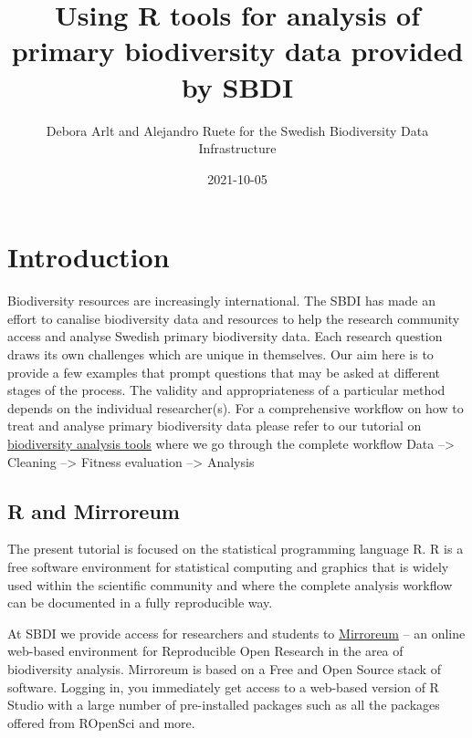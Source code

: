 \documentclass[
  10pt,
]{article}
\title{Using R tools for analysis of primary biodiversity data provided by SBDI}
\author{Debora Arlt and Alejandro Ruete for the Swedish Biodiversity Data Infrastructure}
\date{2021-10-05}
\begin{document}
\maketitle

{
\hypersetup{linkcolor=}
\setcounter{tocdepth}{2}
\tableofcontents
}
\hypertarget{introduction}{%
\section*{Introduction}\label{introduction}}

Biodiversity resources are increasingly international. The SBDI has made an effort to canalise biodiversity data and resources to help the research community access and analyse Swedish primary biodiversity data. Each research question draws its own challenges which are unique in themselves. Our aim here is to provide a few examples that prompt questions that may be asked at different stages of the process. The validity and appropriateness of a particular method depends on the individual researcher(s). For a comprehensive workflow on how to treat and analyse primary biodiversity data please refer to our tutorial on \href{https://github.com/biodiversitydata-se/biodiversity-analysis-tools}{biodiversity analysis tools} where we go through the complete workflow Data --\textgreater{} Cleaning --\textgreater{} Fitness evaluation --\textgreater{} Analysis

\hypertarget{r-and-mirroreum}{%
\subsection*{R and Mirroreum}\label{r-and-mirroreum}}

The present tutorial is focused on the statistical programming language R. R is a free software environment for statistical computing and graphics that is widely used within the scientific community and where the complete analysis workflow can be documented in a fully reproducible way.

At SBDI we provide access for researchers and students to \href{https://mirroreum.biodiversitydata.se/}{Mirroreum} -- an online web-based environment for Reproducible Open Research in the area of biodiversity analysis. Mirroreum is based on a Free and Open Source stack of software. Logging in, you immediately get access to a web-based version of R Studio with a large number of pre-installed packages such as all the packages offered from ROpenSci and more.
\end{document}
